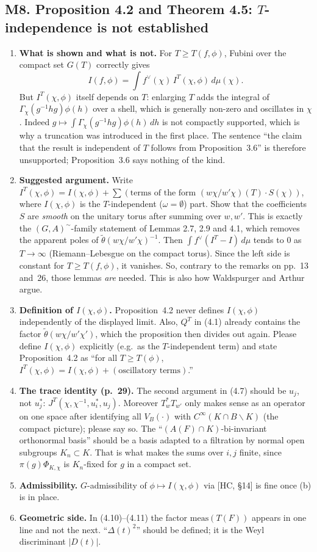 \documentclass[11pt]{article}
\begin{document}
\subsection*{M8. Proposition 4.2 and Theorem 4.5: $T$-independence is not established}
\begin{enumerate}[label=(\alph*)]
\item \textbf{What is shown and what is not.} For $T\ge T(f,\phi)$, Fubini over the compact set $G(T)$ correctly gives
\[I(f,\phi)=\int f^\vee(\chi)\,I^T(\chi,\phi)\,d\mu(\chi).\]
But $I^T(\chi,\phi)$ itself depends on $T$: enlarging $T$ adds the integral of $\Gamma_\chi(g^{-1}hg)\phi(h)$ over a shell, which is generally non-zero and oscillates in $\chi$. Indeed $g\mapsto\int\Gamma_\chi(g^{-1}hg)\phi(h)\,dh$ is not compactly supported, which is why a truncation was introduced in the first place. The sentence ``the claim that the result is independent of $T$ follows from Proposition~3.6'' is therefore unsupported; Proposition~3.6 says nothing of the kind.
\item \textbf{Suggested argument.} Write $I^T(\chi,\phi)=I(\chi,\phi)+\sum(\text{terms of the form } (w\chi/w'\chi)(T)\cdot S(\chi))$, where $I(\chi,\phi)$ is the $T$-independent ($\omega=\emptyset$) part. Show that the coefficients $S$ are \emph{smooth} on the unitary torus after summing over $w,w'$. This is exactly the $(G,A)^\sim$-family statement of Lemmas 2.7, 2.9 and 4.1, which removes the apparent poles of $\tilde\theta(w\chi/w'\chi)^{-1}$. Then $\int f^\vee(I^T-I)\,d\mu$ tends to $0$ as $T\to\infty$ (Riemann--Lebesgue on the compact torus). Since the left side is constant for $T\ge T(f,\phi)$, it vanishes. So, contrary to the remarks on pp.~13 and~26, those lemmas \emph{are} needed. This is also how Waldspurger and Arthur argue.
\item \textbf{Definition of $I(\chi,\phi)$.} Proposition~4.2 never defines $I(\chi,\phi)$ independently of the displayed limit. Also, $Q^T$ in (4.1) already contains the factor $\tilde\theta(w\chi/w'\chi')$, which the proposition then divides out again. Please define $I(\chi,\phi)$ explicitly (e.g.\ as the $T$-independent term) and state Proposition~4.2 as ``for all $T\ge T(\phi)$, $I^T(\chi,\phi)=I(\chi,\phi)+(\text{oscillatory terms})$.''
\item \textbf{The trace identity (p.~29).} The second argument in (4.7) should be $u_j$, not $u_j^*$: $J^T(\chi,\chi^{-1},u_i^*,u_j)$. Moreover $T_w^*T_{w'}$ only makes sense as an operator on one space after identifying all $V_B(\cdot)$ with $C^\infty(K\cap B\backslash K)$ (the compact picture); please say so. The ``$(A(F)\cap K)$-bi-invariant orthonormal basis'' should be a basis adapted to a filtration by normal open subgroups $K_n\subset K$. That is what makes the sums over $i,j$ finite, since $\pi(g)\Phi_{K,\chi}$ is $K_n$-fixed for $g$ in a compact set.
\item \textbf{Admissibility.} $G$-admissibility of $\phi\mapsto I(\chi,\phi)$ via [HC, \S14] is fine once (b) is in place.
\item \textbf{Geometric side.} In (4.10)--(4.11) the factor $\mathrm{meas}(T(F))$ appears in one line and not the next. ``$\Delta(t)^2$'' should be defined; it is the Weyl discriminant $|D(t)|$.
\end{enumerate}
\end{document}
